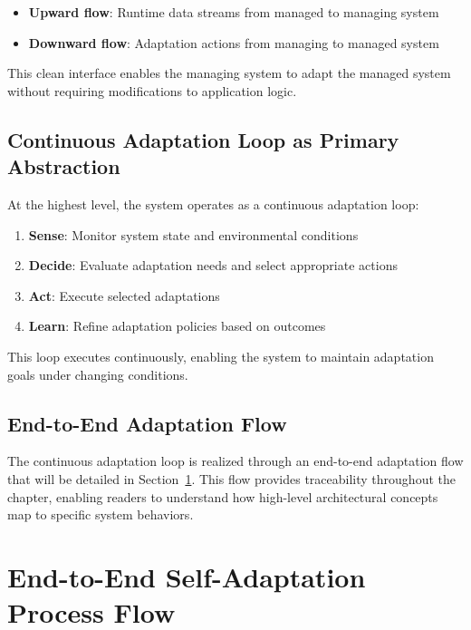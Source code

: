 \documentclass[11pt,a4paper]{article}
\begin{document}
\begin{itemize}
    \item \textbf{Upward flow}: Runtime data streams from managed to managing system
    \item \textbf{Downward flow}: Adaptation actions from managing to managed system
\end{itemize}

This clean interface enables the managing system to adapt the managed system without requiring modifications to application logic.

\subsection{Continuous Adaptation Loop as Primary Abstraction}

At the highest level, the system operates as a continuous adaptation loop:

\begin{enumerate}
    \item \textbf{Sense}: Monitor system state and environmental conditions
    \item \textbf{Decide}: Evaluate adaptation needs and select appropriate actions
    \item \textbf{Act}: Execute selected adaptations
    \item \textbf{Learn}: Refine adaptation policies based on outcomes
\end{enumerate}

This loop executes continuously, enabling the system to maintain adaptation goals under changing conditions.

\subsection{End-to-End Adaptation Flow}

The continuous adaptation loop is realized through an end-to-end adaptation flow that will be detailed in Section~\ref{sec:process-flow}. This flow provides traceability throughout the chapter, enabling readers to understand how high-level architectural concepts map to specific system behaviors.


\section{End-to-End Self-Adaptation Process Flow}
\label{sec:process-flow}
\end{document}
